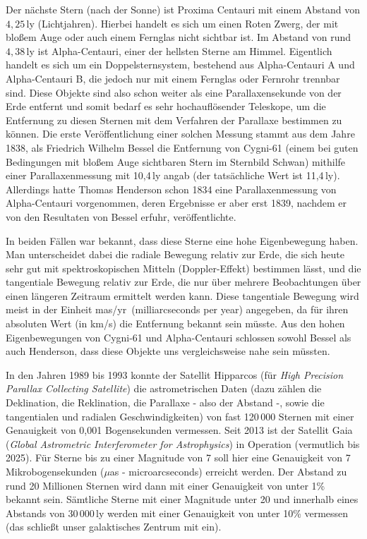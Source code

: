Der n\"achste Stern (nach der Sonne) ist Proxima Centauri 
mit einem Abstand von $4,25$\,ly (Lichtjahren). 
Hierbei handelt es sich um einen Roten Zwerg, der mit blo\ss em Auge oder auch einem Fernglas
nicht sichtbar ist. Im Abstand von rund $4,38$\,ly ist Alpha-Centauri, 
einer der hellsten Sterne am Himmel. 
Eigentlich handelt es sich um ein Doppelsternsystem, bestehend aus Alpha-Centauri A und Alpha-Centauri B, 
die jedoch nur mit einem Fernglas oder Fernrohr trennbar sind. Diese Objekte sind also schon weiter
als eine Parallaxensekunde von der Erde entfernt und somit bedarf es sehr hochaufl\"osender 
Teleskope, um die Entfernung zu diesen Sternen mit dem Verfahren der Parallaxe bestimmen zu k\"onnen.
Die erste Ver\"offentlichung einer solchen Messung stammt aus dem Jahre 1838, als Friedrich Wilhelm
Bessel 
die Entfernung von Cygni-61 
(einem bei guten Bedingungen mit blo\ss em Auge sichtbaren
Stern im Sternbild Schwan) mithilfe einer Parallaxenmessung mit 10,4\,ly angab (der tats\"achliche Wert ist
11,4\,ly). Allerdings hatte Thomas Henderson 
schon 1834 eine Parallaxenmessung von Alpha-Centauri
vorgenommen, deren Ergebnisse er aber erst 1839, nachdem er von den Resultaten von Bessel erfuhr,
ver\"offentlichte. 

In beiden F\"allen war bekannt, dass diese Sterne eine hohe
Eigenbewegung haben. Man unterscheidet dabei die radiale Bewegung relativ zur Erde, die sich heute
sehr gut mit spektroskopischen Mitteln (Doppler-Effekt) bestimmen l\"asst, und die tangentiale Bewegung
relativ zur Erde, die nur \"uber mehrere Beobachtungen \"uber einen l\"angeren Zeitraum ermittelt werden
kann. Diese tangentiale Bewegung wird meist in der Einheit \glqq mas/yr\grqq\ (milliarcseconds per year) 
angegeben, da f\"ur ihren absoluten Wert (in km/s) die Entfernung bekannt sein m\"usste. Aus den hohen
Eigenbewegungen von Cygni-61 und Alpha-Centauri schlossen sowohl Bessel als auch Henderson, dass
diese Objekte uns vergleichsweise nahe sein m\"ussten. 

In den Jahren 1989 bis 1993 konnte der Satellit 
Hipparcos (f\"ur \textit{High Precision Parallax Collecting Satellite})  
die astrometrischen Daten (dazu z\"ahlen die Deklination, die Reklination, die Parallaxe - also der Abstand -,
sowie die tangentialen und radialen Geschwindigkeiten) von fast 120\,000 Sternen mit einer Genauigkeit
von 0,001 Bogensekunden vermessen. 
Seit 2013 ist der Satellit Gaia (\textit{Global Astrometric Interferometer for
Astrophysics}) in Operation (vermutlich bis 2025). F\"ur Sterne bis zu einer Magnitude von 7 soll hier eine
Genauigkeit von 7 Mikrobogensekunden ($\mu$as - microarcseconds) erreicht werden. Der Abstand zu
rund 20 Millionen Sternen wird dann mit einer Genauigkeit von unter 1\% bekannt sein. S\"amtliche
Sterne mit einer Magnitude unter 20 und innerhalb eines Abstands von 30\,000\,ly werden mit einer Genauigkeit 
von unter 10\% vermessen (das schlie\ss t unser galaktisches Zentrum mit ein). 

